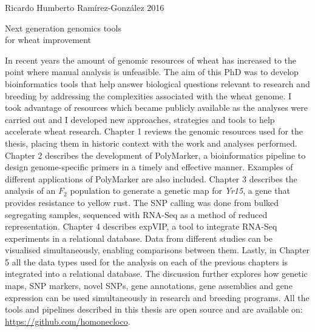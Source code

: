 \documentclass[12pt,a4paper,oneside]{article}
\begin{document}
\setlength\parindent{0pt}
\thispagestyle{empty}

Ricardo Humberto Ramírez-González \hfill  2016 
\vspace{1cm}
\begin{center}
\Huge
Next generation genomics tools \\ for wheat improvement
\end{center}
\normalsize
\vspace{1cm}
In recent years the amount of genomic resources of wheat has increased to the point where manual analysis is unfeasible. 
The aim of this PhD was to develop bioinformatics tools that help answer biological questions relevant to research and breeding by addressing the complexities associated with the wheat genome. 
I took advantage of resources which became publicly available as the analyses were carried out and I developed new approaches, strategies and tools to help accelerate wheat research. 
Chapter 1 reviews the genomic resources used for the thesis, placing them in historic context with the work and analyses performed. 
Chapter 2 describes the development of PolyMarker, a bioinformatics pipeline to design genome-specific primers in a timely and effective manner. 
Examples of different applications of PolyMarker are also included. 
Chapter 3 describes the analysis of an $F_{2}$ population to generate a genetic map for \textit{Yr15}, a gene that provides resistance to yellow rust. 
The SNP calling was done from bulked segregating samples, sequenced with RNA-Seq as a method of reduced representation. 
Chapter 4 describes expVIP, a tool to integrate RNA-Seq experiments in a relational database.
Data from different studies can be visualised simultaneously, enabling comparisons between them. 
Lastly, in Chapter 5 all the data types used for the analysis on each of the previous chapters is integrated into a relational database. 
The discussion further explores how genetic maps, SNP markers, novel SNPs, gene annotations, gene assemblies and gene expression can be used simultaneously in research and breeding programs. 
All the tools and pipelines described in this thesis are open source and are available on: \url{https://github.com/homonecloco}. 
\end{document}
